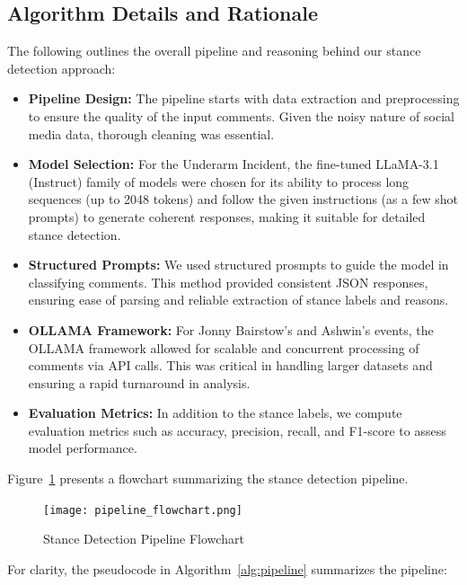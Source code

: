 \documentclass[sigconf, review]{acmart}
\begin{document}
\subsection{Algorithm Details and Rationale}
The following outlines the overall pipeline and reasoning behind our stance detection approach:
\begin{itemize}
    \item \textbf{Pipeline Design:} The pipeline starts with data extraction and preprocessing to ensure the quality of the input comments. Given the noisy nature of social media data, thorough cleaning was essential.
    \item \textbf{Model Selection:} For the Underarm Incident, the fine-tuned LLaMA-3.1 (Instruct) family of models were chosen for its ability to process long sequences (up to 2048 tokens) and follow the given instructions (as a few shot prompts) to generate coherent responses, making it suitable for detailed stance detection.
    \item \textbf{Structured Prompts:} We used structured prosmpts to guide the model in classifying comments. This method provided consistent JSON responses, ensuring ease of parsing and reliable extraction of stance labels and reasons.
    \item \textbf{OLLAMA Framework:} For Jonny Bairstow's and Ashwin's events, the OLLAMA framework allowed for scalable and concurrent processing of comments via API calls. This was critical in handling larger datasets and ensuring a rapid turnaround in analysis.
    \item \textbf{Evaluation Metrics:} In addition to the stance labels, we compute evaluation metrics such as accuracy, precision, recall, and F1-score to assess model performance.
\end{itemize}



Figure~\ref{fig:pipeline} presents a flowchart summarizing the stance detection pipeline.




\begin{figure}[ht]
\centering
\texttt{[image: pipeline\_flowchart.png]}  %
\caption{Stance Detection Pipeline Flowchart}
\label{fig:pipeline}
\end{figure}

For clarity, the pseudocode in Algorithm~\ref{alg:pipeline} summarizes the pipeline:
\end{document}
